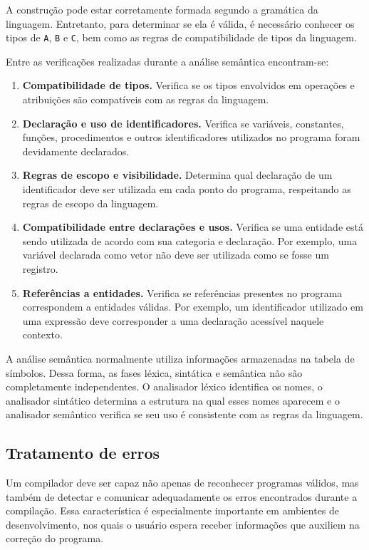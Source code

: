 \documentclass[
  brazilian,
  letterpaper,
]{book}
\theoremstyle{plain}
\theoremstyle{definition}
\theoremstyle{remark}
\begin{document}
A construção pode estar corretamente formada segundo a gramática da
linguagem. Entretanto, para determinar se ela é válida, é necessário
conhecer os tipos de \texttt{A}, \texttt{B} e \texttt{C}, bem como as
regras de compatibilidade de tipos da linguagem.

Entre as verificações realizadas durante a análise semântica
encontram-se:

\begin{enumerate}
\def\labelenumi{\arabic{enumi}.}
\item
  \textbf{Compatibilidade de tipos.} Verifica se os tipos envolvidos em
  operações e atribuições são compatíveis com as regras da linguagem.
\item
  \textbf{Declaração e uso de identificadores.} Verifica se variáveis,
  constantes, funções, procedimentos e outros identificadores utilizados
  no programa foram devidamente declarados.
\item
  \textbf{Regras de escopo e visibilidade.} Determina qual declaração de
  um identificador deve ser utilizada em cada ponto do programa,
  respeitando as regras de escopo da linguagem.
\item
  \textbf{Compatibilidade entre declarações e usos.} Verifica se uma
  entidade está sendo utilizada de acordo com sua categoria e
  declaração. Por exemplo, uma variável declarada como vetor não deve
  ser utilizada como se fosse um registro.
\item
  \textbf{Referências a entidades.} Verifica se referências presentes no
  programa correspondem a entidades válidas. Por exemplo, um
  identificador utilizado em uma expressão deve corresponder a uma
  declaração acessível naquele contexto.
\end{enumerate}

A análise semântica normalmente utiliza informações armazenadas na
tabela de símbolos. Dessa forma, as fases léxica, sintática e semântica
não são completamente independentes. O analisador léxico identifica os
nomes, o analisador sintático determina a estrutura na qual esses nomes
aparecem e o analisador semântico verifica se seu uso é consistente com
as regras da linguagem.

\subsection{Tratamento de erros}\label{tratamento-de-erros}

Um compilador deve ser capaz não apenas de reconhecer programas válidos,
mas também de detectar e comunicar adequadamente os erros encontrados
durante a compilação. Essa característica é especialmente importante em
ambientes de desenvolvimento, nos quais o usuário espera receber
informações que auxiliem na correção do programa.
\end{document}

